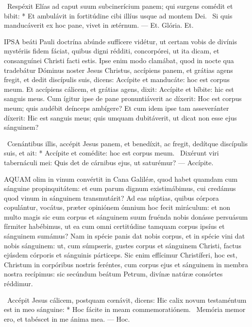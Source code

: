 \R\ Respéxit Elías ad caput suum subcinerícium panem; qui surgens comédit et bibit: * Et ambulávit in fortitúdine cibi illíus usque ad montem Dei. \V\ Si quis manducáverit ex hoc pane, vivet in ætérnum. --- Et. Glória. Et.





\lettrine[lines=2]{I}{PSA} beáti Pauli doctrína abúnde suffícere vidétur, ut certam vobis de divínis mystériis fidem fáciat, quibus digni rédditi, concorpórei, ut ita dicam, et consanguínei Christi facti estis. Ipse enim modo clamábat, quod in nocte qua tradebátur Dóminus noster Jesus Christus, accípiens panem, et grátias agens fregit, et dedit discípulis suis, dicens: Accípite et manducáte: hoc est corpus meum. Et accípiens cálicem, et grátias agens, dixit: Accípite et bíbite: hic est sanguis meus. Cum ígitur ipse de pane pronuntiáverit ac díxerit: Hoc est corpus meum; quis audébit deínceps ambígere? Et cum idem ipse tam asseveránter díxerit: Hic est sanguis meus; quis umquam dubitáverit, ut dicat non esse ejus sánguinem?

\R\ Cœnántibus illis, accépit Jesus panem, et benedíxit, ac fregit, dedítque discípulis suis, et ait: * Accípite et comédite: hoc est corpus meum. \V\ Dixérunt viri tabernáculi mei: Quis det de cárnibus ejus, ut saturémur? --- Accípite.


\lettrine[lines=2]{A}{QUAM} olim in vinum convértit in Cana Galiléæ, quod habet quamdam cum sánguine propinquitátem: et eum parum dignum existimábimus, cui credámus quod vinum in sánguinem transmutárit? Ad eas núptias, quibus córpora copulántur, vocátus, præter opiniónem ómnium hoc fecit miráculum: et non multo magis sic eum corpus et sánguinem suum fruénda nobis donásse persuásum fírmiter habébimus, ut ea cum omni certitúdine tamquam corpus ipsíus et sánguinem sumámus? Nam in spécie panis dat nobis corpus, et in spécie vini dat nobis sánguinem: ut, cum súmpseris, gustes corpus et sánguinem Christi, factus ejúsdem córporis et sánguinis párticeps. Sic enim effícimur Christíferi, hoc est, Christum in corpóribus nostris feréntes, cum corpus ejus et sánguinem in membra nostra recípimus: sic secúndum beátum Petrum, divínæ natúræ consórtes réddimur.

\R\ Accépit Jesus cálicem, postquam cœnávit, dicens: Hic calix novum testaméntum est in meo sánguine: * Hoc fácite in meam commemoratiónem. \V\ Memória memor ero, et tabéscet in me ánima mea. --- Hoc.

